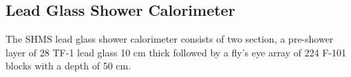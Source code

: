 
\subsection{Lead Glass Shower Calorimeter}

The SHMS lead glass shower calorimeter consists of two section, a
pre-shower layer of 28 TF-1 lead glass 10 cm thick followed by a fly's eye
array of 224 F-101 blocks with a depth of 50 cm.
